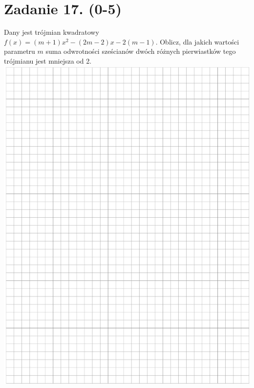 \documentclass[10pt]{article}
\begin{document}
\section*{Zadanie 17. (0-5)}
Dany jest trójmian kwadratowy \(f(x)=(m+1) x^{2}-(2 m-2) x-2(m-1)\). Oblicz, dla jakich wartości parametru \(m\) suma odwrotności sześcianów dwóch różnych pierwiastków tego trójmianu jest mniejsza od 2.\\
\includegraphics[max width=\textwidth, center]{2024_11_21_c0ca116654784d42326bg-14}\\
\(\qquad\)
\end{document}
